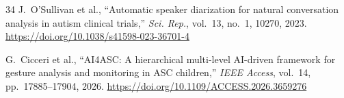 \documentclass[3p,twocolumn,times]{elsarticle}
\begin{document}
\begin{thebibliography}{34}
		J.~O'Sullivan et al.,
		``Automatic speaker diarization for natural conversation analysis in autism
		clinical trials,''
		\textit{Sci. Rep.}, vol.~13, no.~1, 10270, 2023.
		\url{https://doi.org/10.1038/s41598-023-36701-4}
		
		G.~Cicceri et al.,
		``AI4ASC: A hierarchical multi-level AI-driven framework for gesture analysis
		and monitoring in ASC children,''
		\textit{IEEE Access}, vol.~14, pp.~17885--17904, 2026.
		\url{https://doi.org/10.1109/ACCESS.2026.3659276}
		
	\end{thebibliography}
	
\end{document}
